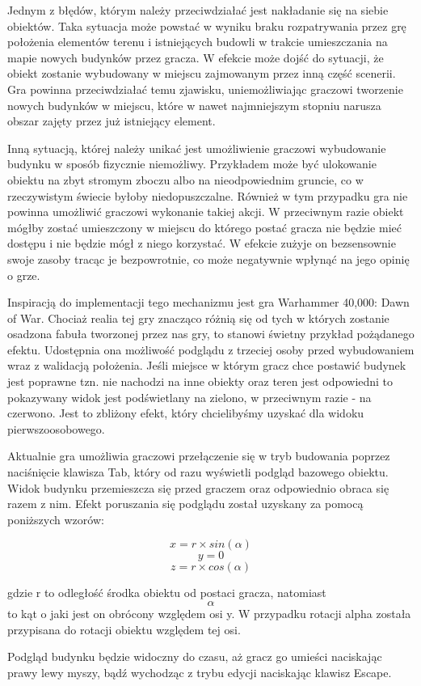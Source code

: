 Jednym z błędów, którym należy przeciwdziałać jest nakładanie się na siebie obiektów. Taka sytuacja może powstać w wyniku braku rozpatrywania przez grę położenia elementów terenu i istniejących budowli w trakcie umieszczania na mapie nowych budynków przez gracza. W efekcie może dojść do sytuacji, że obiekt zostanie wybudowany w miejscu zajmowanym przez inną część scenerii. Gra powinna przeciwdziałać temu zjawisku, uniemożliwiając graczowi tworzenie nowych budynków w miejscu, które w nawet najmniejszym stopniu narusza obszar zajęty przez już istniejący element.

Inną sytuacją, której należy unikać jest umożliwienie graczowi wybudowanie budynku w sposób fizycznie niemożliwy. Przykładem może być ulokowanie obiektu na zbyt stromym zboczu albo na nieodpowiednim gruncie, co w rzeczywistym świecie byłoby niedopuszczalne. Również w tym przypadku gra nie powinna umożliwić graczowi wykonanie takiej akcji. W przeciwnym razie obiekt mógłby zostać umieszczony w miejscu do którego postać gracza nie będzie mieć dostępu i nie będzie mógł z niego korzystać. W efekcie zużyje on bezsensownie swoje zasoby tracąc je bezpowrotnie, co może negatywnie wpłynąć na jego opinię o grze.

Inspiracją do implementacji tego mechanizmu jest gra Warhammer 40,000: Dawn of War. Chociaż realia tej gry znacząco różnią się od tych w których zostanie osadzona fabuła tworzonej przez nas gry, to stanowi świetny przykład pożądanego efektu. Udostępnia ona możliwość podglądu z trzeciej osoby przed wybudowaniem wraz z walidacją położenia. Jeśli miejsce w którym gracz chce postawić budynek jest poprawne tzn. nie nachodzi na inne obiekty oraz teren jest odpowiedni to pokazywany widok jest podświetlany na zielono, w przeciwnym razie - na czerwono. Jest to zbliżony efekt, który chcielibyśmy uzyskać dla widoku pierwszoosobowego.

Aktualnie gra umożliwia graczowi przełączenie się w tryb budowania poprzez naciśnięcie klawisza Tab, który od razu wyświetli podgląd bazowego obiektu. Widok budynku przemieszcza się przed graczem oraz odpowiednio obraca się razem z nim. Efekt poruszania się podglądu został uzyskany za pomocą poniższych wzorów:

$$ x = r \times sin(\alpha) $$
$$ y = 0 $$
$$ z = r \times cos(\alpha) $$

gdzie r to odległość środka obiektu od postaci gracza, natomiast $$\alpha$$ to kąt o jaki jest on obrócony względem osi y. W przypadku rotacji alpha została przypisana do rotacji obiektu względem tej osi.

Podgląd budynku będzie widoczny do czasu, aż gracz go umieści naciskając prawy lewy myszy, bądź wychodząc z trybu edycji naciskając klawisz Escape.
